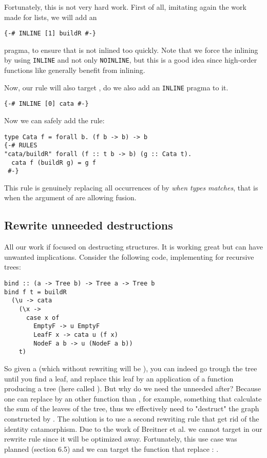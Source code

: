 Fortunately, this is not very hard work. First of all, imitating again the work made for lists, we will add an 
\begin{verbatim}
{-# INLINE [1] buildR #-}
\end{verbatim}
pragma, to ensure that  is not inlined too quickly. Note that we force the inlining by using \verb|INLINE| and not only \verb|NOINLINE|, but this is a good idea since high-order functions like  generally benefit from inlining. 

Now, our rule will also target , do we also add an \verb|INLINE| pragma to it.
\begin{verbatim}
{-# INLINE [0] cata #-}
\end{verbatim}

Now we can safely add the rule:
\begin{verbatim}
type Cata f = forall b. (f b -> b) -> b
{-# RULES
"cata/buildR" forall (f :: t b -> b) (g :: Cata t).
  cata f (buildR g) = g f
 #-}
\end{verbatim}
This rule is genuinely replacing all occurrences of  by  \emph{when types matches}, that is when the argument of  are allowing fusion.

\subsection{Rewrite unneeded destructions}
All our work if focused on destructing structures. It is working great but can have unwanted implications. Consider the following code, implementing  for recursive trees:

\begin{verbatim}
bind :: (a -> Tree b) -> Tree a -> Tree b
bind f t = buildR
  (\u -> cata
    (\x ->
      case x of
        EmptyF -> u EmptyF
        LeafF x -> cata u (f x)
        NodeF a b -> u (NodeF a b))
    t)
\end{verbatim}

So given a  (which without rewriting will be ), you can indeed go trough the tree until you find a leaf, and replace this leaf by an application of a function producing a tree (here called ). But why do we need the unneeded  after? Because one can replace  by an other function than , for example, something that calculate the sum of the leaves of the tree, thus we effectively need to "destruct" the graph constructed by . The solution is to use a second rewriting rule that get rid of the identity catamorphism. Due to the work of Breitner et al. \cite{Breitner:2014:SZC:2692915.2628141} we cannot target  in our rewrite rule since it will be optimized away. Fortunately, this use case was planned (section 6.5) and we can target the function that replace : . 

